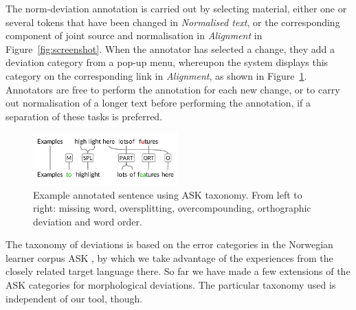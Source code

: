 \documentclass[10pt, a4paper]{article}
\newcommand{\mats}[1]{{\color{Blue}{Mats: #1}}}
\begin{document}
The norm-deviation annotation is carried out by selecting material, either
one or several tokens that have been changed in {\em Normalised text},
or the corresponding component of joint source and normalisation in {\em Alignment} in Figure~\ref{fig:screenshot}.
When the annotator has selected a change, they add a deviation
category from a pop-up menu, whereupon the system displays this category on the
corresponding link in {\em Alignment}, as shown in Figure~\ref{fig:normann}.
Annotators are free to perform the annotation for each new change, or to carry out normalisation of a longer text before performing the annotation, if a separation of these tasks is preferred.


\begin{figure}[t] %
\includegraphics[height=2.0cm, trim={-0.5cm 0.55cm 0 0}, clip]{features7.pdf}
\caption{Example annotated sentence using ASK taxonomy. From left to right:
missing word, oversplitting, overcompounding, orthographic deviation and
word order.
\label{fig:normann}}
\end{figure}

The taxonomy of deviations is based on the error categories in the Norwegian
learner corpus ASK \cite{tenfjord2006ask}, by which we take advantage of the experiences from the closely related target language there. So far we have made a few extensions of the ASK categories for morphological deviations. The particular taxonomy used is independent of our tool, though.


\end{document}
